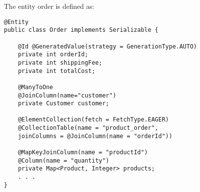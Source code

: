 The entity order is defined as:  
\begin{lstlisting}[style=Java]
@Entity
public class Order implements Serializable {

    @Id @GeneratedValue(strategy = GenerationType.AUTO)
    private int orderId;
    private int shippingFee;
    private int totalCost;

    @ManyToOne
    @JoinColumn(name="customer") 
    private Customer customer;

    @ElementCollection(fetch = FetchType.EAGER)
    @CollectionTable(name = "product_order",
    joinColumns = @JoinColumn(name = "orderId"))

    @MapKeyJoinColumn(name = "productId") 
    @Column(name = "quantity")
    private Map<Product, Integer> products;
    . . .
}
\end{lstlisting}